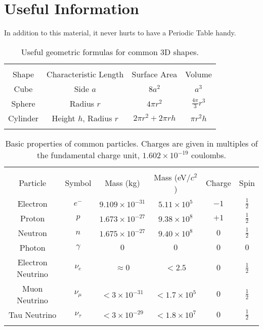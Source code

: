 \documentclass[12pt]{article}
\begin{document}
\section{Useful Information}

In addition to this material, it never hurts to have a Periodic Table
handy.

\begin{table}[!h]
\begin{tabular}{cccc}
\hline\hline\\
Shape & Characteristic Length & Surface Area & Volume \\
\hline
Cube & Side $a$ & $8a^2$ & $a^3$\\
Sphere & Radius $r$ & $4\pi r^2$ & $\frac{4\pi}{3}r^3$\\
Cylinder & Height $h$, Radius $r$ & $2\pi r^2  + 2\pi rh$
& $\pi r^2 h$ \\
\hline\hline\\
\end{tabular}
\caption{Useful geometric formulas for common 3D shapes.}
\end{table}

\begin{table}[!h]
\begin{tabular}{cccccc}
\hline\hline\\
Particle & Symbol & Mass (kg) & Mass (eV/$c^2$) & Charge & Spin \\
\hline
Electron &$e^-$& $9.109\times10^{-31}$ & $5.11\times10^5$ 
  & $-1$ & $\frac{1}{2}$\\
Proton & $p$ & $1.673\times10^{-27}$ & $9.38\times10^8$ 
  & $+1$ & $\frac{1}{2}$\\
Neutron & $n$ &  $1.675\times10^{-27}$ & $9.40\times10^8$ 
  & $0$ & $\frac{1}{2}$\\
Photon & $\gamma$ & $0$ & $0$ & $0$ & $0$\\
Electron Neutrino & $\nu_e$& $\approx 0$ & $< 2.5$ & $0$ & $\frac{1}{2}$\\
Muon Neutrino & $\nu_\mu$ & $< 3\times10^{-31}$ & $< 1.7\times10^5$ 
  & $0$ & $\frac{1}{2}$\\
Tau Neutrino & $\nu_\tau$ & $< 3\times10^{-29}$ & $< 1.8\times10^7$ 
  & $0$ & $\frac{1}{2}$\\
\hline\hline\\
\end{tabular}
\caption{Basic properties of common particles.  Charges are given
in multiples of the fundamental charge unit, $1.602\times10^{-19}$ coulombs.}
\end{table}
\end{document}
